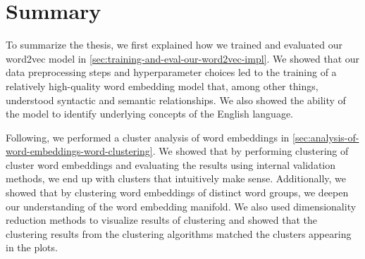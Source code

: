 \section{Summary}
\label{sec:summary}
To summarize the thesis, we first explained how we trained and evaluated our word2vec model in \cref{sec:training-and-eval-our-word2vec-impl}. We showed that our data preprocessing steps and hyperparameter choices led to the training of a relatively high-quality word embedding model that, among other things, understood syntactic and semantic relationships. We also showed the ability of the model to identify underlying concepts of the English language.

Following, we performed a cluster analysis of word embeddings in \cref{sec:analysis-of-word-embeddings-word-clustering}. We showed that by performing clustering of cluster word embeddings and evaluating the results using internal validation methods, we end up with clusters that intuitively make sense. Additionally, we showed that by clustering word embeddings of distinct word groups, we deepen our understanding of the word embedding manifold. We also used dimensionality reduction methods to visualize results of clustering and showed that the clustering results from the clustering algorithms matched the clusters appearing in the plots.

